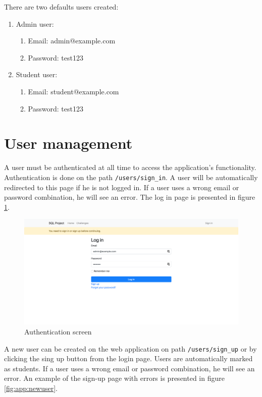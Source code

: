 There are two defaults users created:
\begin{enumerate}
    \item Admin user:
    \begin{enumerate}
        \item Email: admin@example.com
        \item Password: test123
    \end{enumerate}
    \item Student user:
    \begin{enumerate}
        \item Email: student@example.com
        \item Password: test123
    \end{enumerate}
\end{enumerate}

\section{User management}
A user must be authenticated at all time to access the application's functionality. Authentication is done on the path \texttt{/users/sign\_in}. A user will be automatically redirected to this page if he is not logged in. If a user uses a wrong email or password combination, he will see an error. The log in page is presented in figure \ref{fig:app:authentication}.

\begin{figure}
    \centering
    \includegraphics[width=\textwidth/4*3]{Appendices/authentication.png}
    \caption{Authentication screen}
    \label{fig:app:authentication}
\end{figure}

A new user can be created on the web application on path \texttt{/users/sign\_up} or by clicking the sing up button from the login page. Users are automatically marked as students. If a user uses a wrong email or password combination, he will see an error. An example of the sign-up page with errors is presented in figure \ref{fig:app:newuser}.

